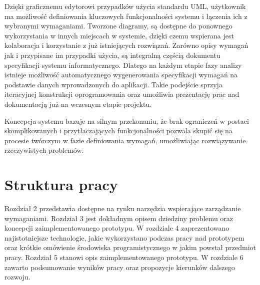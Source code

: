       Dzięki graficznemu edytorowi przypadków użycia standardu UML, użytkownik ma możliwość definiowania kluczowych funkcjonalności systemu i łączenia ich z wybranymi wymaganiami. Tworzone diagramy, są dostępne do ponownego wykorzystania w innych miejscach w systemie, dzięki czemu wspierana jest kolaboracja i korzystanie z już istniejących rozwiązań. Zarówno opisy wymagań jak i przypisane im przypadki użycia, są integralną częścią dokumentu specyfikacji systemu informatycznego. Dlatego na każdym etapie fazy analizy istnieje możliwość automatycznego wygenerowania specyfikacji wymagań na podstawie danych wprowadzonych do aplikacji. Takie podejście sprzyja iteracyjnej konstrukcji oprogramowania oraz umożliwia prezentację prac nad dokumentacją już na wczesnym etapie projektu. 

      Koncepcja systemu bazuje na silnym przekonaniu, że brak ograniczeń w postaci skomplikowanych i przytłaczających funkcjonalności pozwala skupić się na procesie twórczym w fazie definiowania wymagań, umożliwiając rozwiązywanie rzeczywistych problemów. 

    \section{Struktura pracy}

      Rozdział 2 przedstawia dostępne na rynku narzędzia wspierające zarządzanie wymaganiami. Rozdział 3 jest dokładnym opisem dziedziny problemu oraz koncepcji zaimplementowanego prototypu. W rozdziale 4 zaprezentowano najistotniejsze technologie, jakie wykorzystano podczas pracy nad prototypem oraz krótkie omówienie środowiska programistycznego w jakim powstał przedmiot pracy. Rozdział 5 stanowi opis zaimplementowanego prototypu. W rozdziale 6 zawarto podsumowanie wyników pracy oraz propozycje kierunków dalszego rozwoju. 
